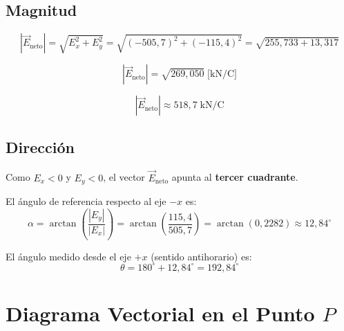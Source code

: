 \documentclass[12pt,letterpaper]{article}
\begin{document}
\subsection*{Magnitud}

\begin{equation*}
|\vec{E}_{\text{neto}}| = \sqrt{E_x^2 + E_y^2}
= \sqrt{(-505{,}7)^2 + (-115{,}4)^2}
= \sqrt{255{,}733 + 13{,}317}
\end{equation*}

\begin{equation*}
|\vec{E}_{\text{neto}}| = \sqrt{269{,}050}\;\text{[kN/C]}
\end{equation*}

\begin{equation*}
\boxed{|\vec{E}_{\text{neto}}| \approx 518{,}7\;\text{kN/C}}
\end{equation*}

\subsection*{Direcci\'on}

Como $E_x < 0$ y $E_y < 0$, el vector $\vec{E}_{\text{neto}}$ apunta al \textbf{tercer cuadrante}.

El \'angulo de referencia respecto al eje $-x$ es:
\begin{equation*}
\alpha = \arctan\!\left(\frac{|E_y|}{|E_x|}\right)
= \arctan\!\left(\frac{115{,}4}{505{,}7}\right)
= \arctan(0{,}2282)
\approx 12{,}84^\circ
\end{equation*}

El \'angulo medido desde el eje $+x$ (sentido antihorario) es:
\begin{equation*}
\boxed{\theta = 180^\circ + 12{,}84^\circ = 192{,}84^\circ}
\end{equation*}

\section*{Diagrama Vectorial en el Punto $P$}
\end{document}
